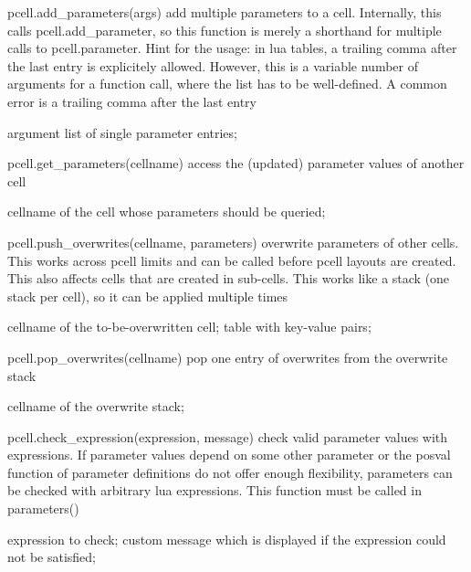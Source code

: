 \begin{APIfunc}{pcell.add\_parameters(args)}
    add multiple parameters to a cell. Internally, this calls pcell.add\_parameter, so this function is merely a shorthand for multiple calls to pcell.parameter. Hint for the usage: in lua tables, a trailing comma after the last entry is explicitely allowed. However, this is a variable number of arguments for a function call, where the list has to be well-defined. A common error is a trailing comma after the last entry
    \begin{APIparameters}
            argument list of single parameter entries;
    \end{APIparameters}
\end{APIfunc}
\begin{APIfunc}{pcell.get\_parameters(cellname)}
    access the (updated) parameter values of another cell
    \begin{APIparameters}
            cellname of the cell whose parameters should be queried;
    \end{APIparameters}
\end{APIfunc}
\begin{APIfunc}{pcell.push\_overwrites(cellname, parameters)}
    overwrite parameters of other cells. This works across pcell limits and can be called before pcell layouts are created. This also affects cells that are created in sub-cells. This works like a stack (one stack per cell), so it can be applied multiple times
    \begin{APIparameters}
            cellname of the to-be-overwritten cell;
            table with key-value pairs;
    \end{APIparameters}
\end{APIfunc}
\begin{APIfunc}{pcell.pop\_overwrites(cellname)}
    pop one entry of overwrites from the overwrite stack
    \begin{APIparameters}
            cellname of the overwrite stack;
    \end{APIparameters}
\end{APIfunc}
\begin{APIfunc}{pcell.check\_expression(expression, message)}
    check valid parameter values with expressions. If parameter values depend on some other parameter or the posval function of parameter definitions do not offer enough flexibility, parameters can be checked with arbitrary lua expressions. This function must be called in parameters()
    \begin{APIparameters}
            expression to check;
            custom message which is displayed if the expression could not be satisfied;
    \end{APIparameters}
\end{APIfunc}
